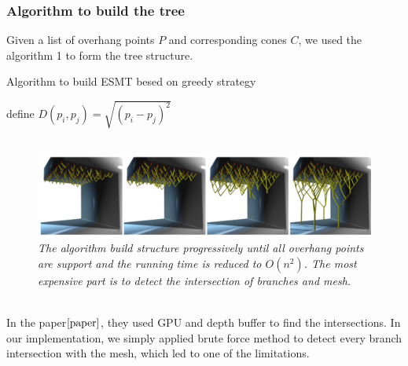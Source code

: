 \documentclass[11pt, a4paper]{article}
\begin{document}
	\subsubsection{Algorithm to build the tree}
	Given a list of overhang points $P$ and corresponding cones $C$, we used the algorithm 1 to form the tree structure.
	\begin{algorithm}
	\caption{Algorithm to build ESMT besed on greedy strategy}
	define $D(p_i, p_j)=\sqrt{(p_i-p_j)^{2}}$ ~\\
	
	~\\
	\end{algorithm}

	\begin{figure}[!ht]
  		\centering
      	\includegraphics[width=\textwidth]{Figure_5.png}
  	\caption{\textit{The algorithm build structure progressively until all overhang points are support and the running time is reduced to $O(n^{2})$. The most expensive part is to detect the intersection of branches and mesh.}}
	\end{figure}
	~\\In the paper$\cite{paper}$, they used GPU and depth buffer to find the intersections. In our implementation, we simply applied brute force method to detect every branch intersection with the mesh, which led to one of the limitations.
\end{document}
